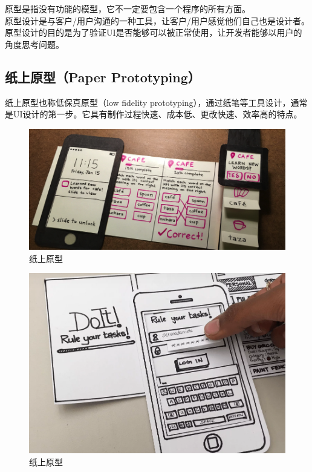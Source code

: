 原型是指没有功能的模型，它不一定要包含一个程序的所有方面。\\

原型设计是与客户/用户沟通的一种工具，让客户/用户感觉他们自己也是设计者。原型设计的目的是为了验证UI是否能够可以被正常使用，让开发者能够以用户的角度思考问题。\\

\subsection{纸上原型（Paper Prototyping）}

纸上原型也称低保真原型（low fidelity prototyping），通过纸笔等工具设计，通常是UI设计的第一步。它具有制作过程快速、成本低、更改快速、效率高的特点。\\

\begin{figure}[H]
    \centering
    \includegraphics[scale=0.5]{img/C1/1-3/1.png}
    \caption{纸上原型}
\end{figure}

\begin{figure}[H]
    \centering
    \includegraphics[scale=0.7]{img/C1/1-3/2.png}
    \caption{纸上原型}
\end{figure}

